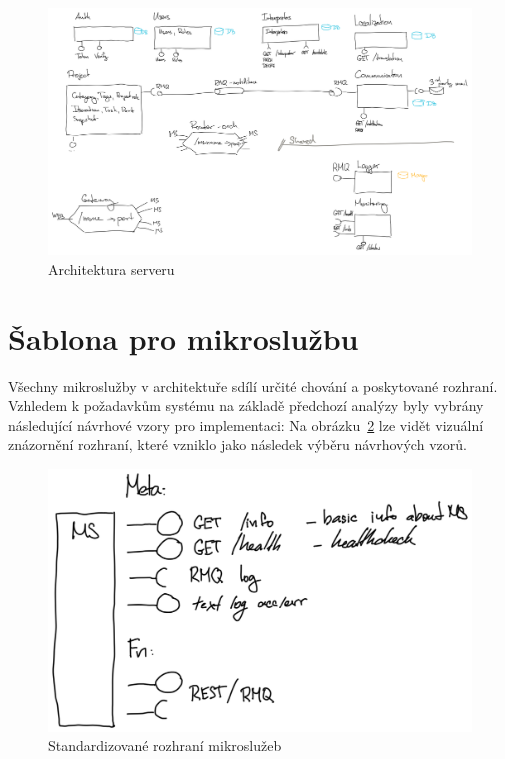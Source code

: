 \begin{figure}[htbp]
   \centering
   \includegraphics[max width=\textwidth]{assets/draft-server-arch}
   \caption{Architektura serveru}\label{fig:server-arch}
\end{figure}



\section{Šablona pro mikroslužbu}\label{sec:server-template}

Všechny mikroslužby v architektuře sdílí určité chování a poskytované rozhraní.
Vzhledem k požadavkům systému na základě předchozí analýzy byly vybrány následující návrhové vzory pro implementaci:
Na obrázku~\ref{fig:ms-template} lze vidět vizuální znázornění rozhraní, které vzniklo jako následek výběru návrhových vzorů.


\begin{figure}[htbp]
   \centering
   \includegraphics[max width=\textwidth]{assets/draft-ms-template}
   \caption{Standardizované rozhraní mikroslužeb}\label{fig:ms-template}
\end{figure}

